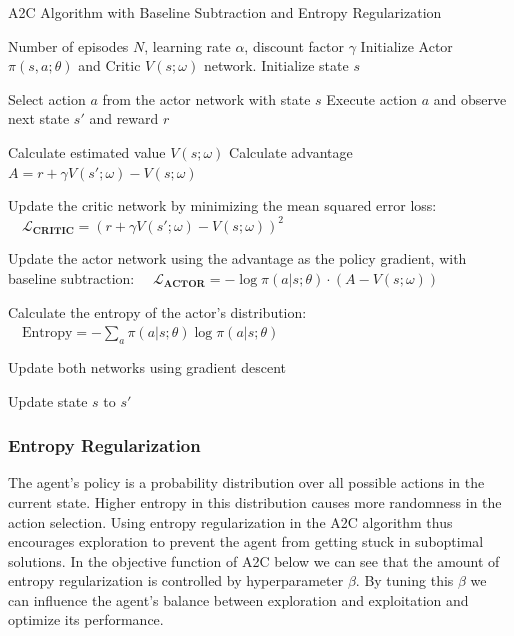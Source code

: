 \documentclass{article}
\begin{document}
\begin{algorithm}[H]
    \caption{A2C Algorithm with Baseline Subtraction and Entropy Regularization}
    \label{alg:A2C}
      \begin{algorithmic}[1]
      \REQUIRE Number of episodes $N$, learning rate $\alpha$, discount factor $\gamma$
      \STATE Initialize Actor $\pi(s, a; \theta)$ and Critic $V(s; \omega)$ network.
          \STATE Initialize state $s$
      
              \STATE Select action $a$ from the actor network with state $s$
              \STATE Execute action $a$ and observe next state $s'$ and reward $r$
              
              \STATE Calculate estimated value $V(s; \omega)$
              \STATE Calculate advantage $A = r + \gamma V(s'; \omega) - V(s; \omega)$
              
              \STATE Update the critic network by minimizing the mean squared error loss:
              \STATE $\quad \mathcal{L}_{\textbf{CRITIC}} = (r + \gamma V(s'; \omega) - V(s; \omega))^2$
              
              \STATE Update the actor network using the advantage as the policy gradient, with baseline subtraction:
              \STATE $\quad \mathcal{L}_{\textbf{ACTOR}} = -\log \pi(a|s; \theta) \cdot (A - V(s; \omega))$
              
              \STATE Calculate the entropy of the actor's distribution:
              \STATE $\quad \text{Entropy} = -\sum_{a} \pi(a|s; \theta) \log \pi(a|s; \theta)$
              
              \STATE Update both networks using gradient descent
              
              \STATE Update state $s$ to $s'$
          \ENDWHILE
      \ENDFOR
  \end{algorithmic}
  \end{algorithm}

\subsubsection{Entropy Regularization}
\label{sssec:entreg}

The agent's policy is a probability distribution over all possible actions in the current state.
Higher entropy in this distribution causes more randomness in the action selection.
Using entropy regularization in the A2C algorithm thus encourages exploration to prevent the agent from getting stuck in suboptimal solutions.
In the objective function of A2C below we can see that the amount of entropy regularization is controlled by hyperparameter $\beta$.
By tuning this $\beta$ we can influence the agent's balance between exploration and exploitation and optimize its performance.
\end{document}
